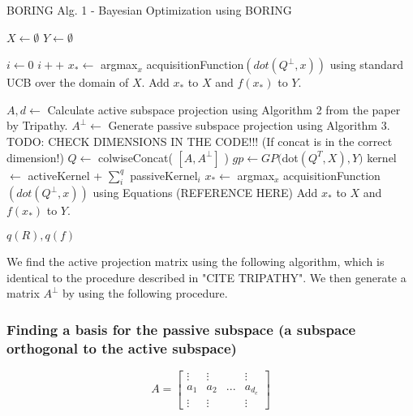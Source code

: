 \begin{algorithm}[H]
\caption{BORING Alg. 1 - Bayesian Optimization using BORING}

\begin{algorithmic} 
\STATE $X \leftarrow \emptyset$
\STATE $Y \leftarrow \emptyset$

\STATE $i \leftarrow 0$
\STATE $i++$
\STATE $x_* \leftarrow $ argmax$_x$ acquisitionFunction$(dot(Q^{\bot}, x) )$ using standard UCB over the domain of $X$.
\STATE Add $x_*$ to $X$ and $ f(x_*)$ to $Y$.
\ENDWHILE

\STATE $A, d \leftarrow $ Calculate active subspace projection using Algorithm 2 from the paper by Tripathy.
\STATE $A^{\bot} \leftarrow $ Generate passive subspace projection using Algorithm 3.
\STATE TODO: CHECK DIMENSIONS IN THE CODE!!! (If concat is in the correct dimension!)
\STATE $Q \leftarrow $ colwiseConcat( $[A, A^{\bot}]$ ) 
\STATE $gp \leftarrow GP( $dot$( Q^T, X), Y)$
\STATE kernel $\leftarrow$ activeKernel + $\sum_i^{q}$ passiveKernel$_i$ 
\STATE $x_* \leftarrow $ argmax$_x$ acquisitionFunction$(dot(Q^{\bot}, x) )$ using Equations (REFERENCE HERE)
\STATE Add $x_*$ to $X$ and $ f(x_*)$ to $Y$.
\ENDWHILE

\RETURN $q(R), q(f)$
\end{algorithmic}

\end{algorithm}


We find the active projection matrix using the following algorithm, which is identical to the procedure described in "CITE TRIPATHY".
We then generate a matrix $ A^{\bot} $ by using the following procedure.

\subsubsection{Finding a basis for the passive subspace (a subspace orthogonal to the active subspace)}

\begin{equation}
A = 
\begin{bmatrix}
 \vdots & \vdots & & \vdots \\
 a_1 & a_2 & ... & a_{d_e} \\
 \vdots & \vdots & & \vdots
\end{bmatrix}
\label{eq:maximalEmbedding}
\end{equation}

